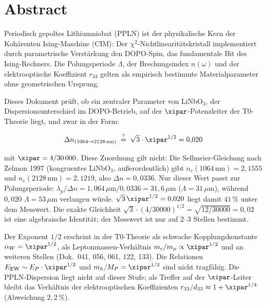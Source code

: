 
\section*{Abstract}

Periodisch gepoltes Lithiumniobat (PPLN) ist der physikalische Kern der
Kohärenten Ising-Maschine (CIM): Der $\chi^2$-Nichtlinearitätskristall
implementiert durch parametrische Verstärkung den DOPO-Spin, das fundamentale
Bit des Ising-Rechners. Die Polungsperiode $\Lambda$, der Brechungsindex
$n(\omega)$ und der elektrooptische Koeffizient $r_{33}$ gelten als empirisch
bestimmte Materialparameter ohne geometrischen Ursprung.

Dieses Dokument prüft, ob ein zentraler Parameter von LiNbO$_3$, der
Dispersionsunterschied im DOPO-Betrieb, auf der $\xipar$-Potenzleiter der
T0-Theorie liegt, und zwar in der Form:

\begin{equation}
    \Delta n_{(1064 \to 2128\,\text{nm})} \;\stackrel{?}{=}\; \sqrt{3}\cdot\xipar^{1/2} = 0{,}020
    \label{eq:main}
\end{equation}

mit $\xipar = 4/30\,000$. Diese Zuordnung gilt nicht: Die Sellmeier-Gleichung nach
Zelmon 1997 (kongruentes LiNbO$_3$, außerordentlich) gibt
$n_e(1064\,\text{nm}) = 2{,}1555$ und $n_e(2128\,\text{nm}) = 2{,}1219$, also
$\Delta n = 0{,}0336$. Nur dieser Wert passt zur Polungsperiode:
$\lambda_p/\Delta n = 1{,}064\,\mu\text{m}/0{,}0336 = 31{,}6\,\mu$m ($\Lambda = 31\,\mu$m),
während $0{,}020$ $\Lambda = 53\,\mu$m verlangen würde. $\sqrt{3}\,\xipar^{1/2} = 0{,}020$
liegt damit $41\,\%$ unter dem Messwert. Die exakte Gleichheit
$\sqrt{3}\cdot(4/30000)^{1/2} = \sqrt{12/30000} = 0{,}02$ ist eine algebraische
Identität; der Messwert ist nur auf 2--3 Stellen bestimmt.

Der Exponent $1/2$ erscheint in der T0-Theorie als schwache
Kopplungskonstante $\alpha_W = \xipar^{1/2}$, als Leptonmassen-Verhältnis
$m_e/m_\mu \propto \xipar^{1/2}$ und an weiteren Stellen
(Dok.~041, 056, 061, 122, 133). Die Relationen $E_\mathrm{EW} \sim E_P \cdot \xipar^{1/2}$
und $m_h/M_P = \xipar^{1/2}$ sind nicht tragfähig. Die PPLN-Dispersion liegt nicht
auf dieser Stufe; als Treffer auf der $\xipar$-Leiter bleibt das Verhältnis der
elektrooptischen Koeffizienten $r_{33}/d_{33} \approx 1 + \xipar^{1/4}$
(Abweichung $2{,}2\,\%$).

